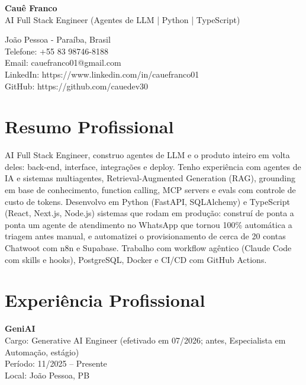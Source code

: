 \documentclass[10pt,a4paper]{article}
\begin{document}
\textbf{\Large Cauê Franco} \\
AI Full Stack Engineer (Agentes de LLM | Python | TypeScript)

João Pessoa - Paraíba, Brasil \\
Telefone: +55 83 98746-8188 \\
Email: cauefranco01@gmail.com \\
LinkedIn: https://www.linkedin.com/in/cauefranco01 \\
GitHub: https://github.com/cauedev30

\section*{Resumo Profissional}

AI Full Stack Engineer, construo agentes de LLM e o produto inteiro em volta
deles: back-end, interface, integrações e deploy. Tenho experiência com
agentes de IA e sistemas multiagentes, Retrieval-Augmented Generation (RAG),
grounding em base de conhecimento, function calling, MCP servers e evals com
controle de custo de tokens. Desenvolvo em Python (FastAPI, SQLAlchemy) e
TypeScript (React, Next.js, Node.js) sistemas que rodam em produção: construí
de ponta a ponta um agente de atendimento no WhatsApp que tornou 100\%
automática a triagem antes manual, e automatizei o provisionamento de cerca de
20 contas Chatwoot com n8n e Supabase. Trabalho com workflow agêntico (Claude
Code com skills e hooks), PostgreSQL, Docker e CI/CD com GitHub Actions.

\section*{Experiência Profissional}

\textbf{GeniAI} \\
Cargo: Generative AI Engineer (efetivado em 07/2026; antes, Especialista em Automação, estágio) \\
Período: 11/2025 -- Presente \\
Local: João Pessoa, PB
\end{document}
